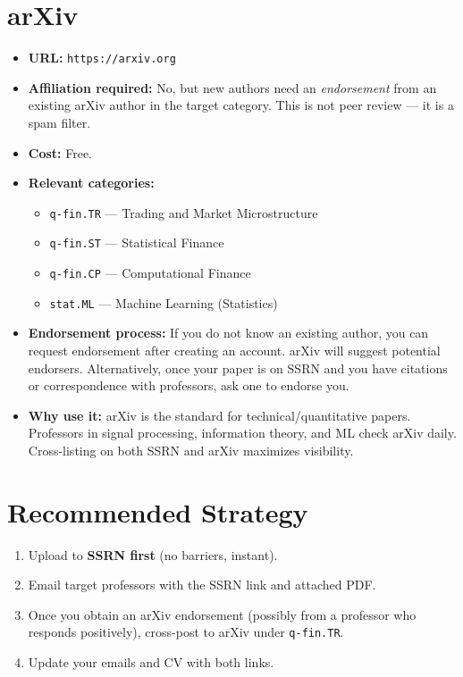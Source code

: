\documentclass[11pt,a4paper]{article}
\newcommand{\url}[1]{\texttt{#1}}
\begin{document}
\section{arXiv}

\begin{itemize}
  \item \textbf{URL:} \url{https://arxiv.org}
  \item \textbf{Affiliation required:} No, but new authors need an \textit{endorsement} from an existing arXiv author in the target category. This is not peer review --- it is a spam filter.
  \item \textbf{Cost:} Free.
  \item \textbf{Relevant categories:}
    \begin{itemize}
      \item \texttt{q-fin.TR} --- Trading and Market Microstructure
      \item \texttt{q-fin.ST} --- Statistical Finance
      \item \texttt{q-fin.CP} --- Computational Finance
      \item \texttt{stat.ML} --- Machine Learning (Statistics)
    \end{itemize}
  \item \textbf{Endorsement process:} If you do not know an existing author, you can request endorsement after creating an account. arXiv will suggest potential endorsers. Alternatively, once your paper is on SSRN and you have citations or correspondence with professors, ask one to endorse you.
  \item \textbf{Why use it:} arXiv is the standard for technical/quantitative papers. Professors in signal processing, information theory, and ML check arXiv daily. Cross-listing on both SSRN and arXiv maximizes visibility.
\end{itemize}

\section{Recommended Strategy}

\begin{enumerate}
  \item Upload to \textbf{SSRN first} (no barriers, instant).
  \item Email target professors with the SSRN link and attached PDF.
  \item Once you obtain an arXiv endorsement (possibly from a professor who responds positively), cross-post to arXiv under \texttt{q-fin.TR}.
  \item Update your emails and CV with both links.
\end{enumerate}
\end{document}
